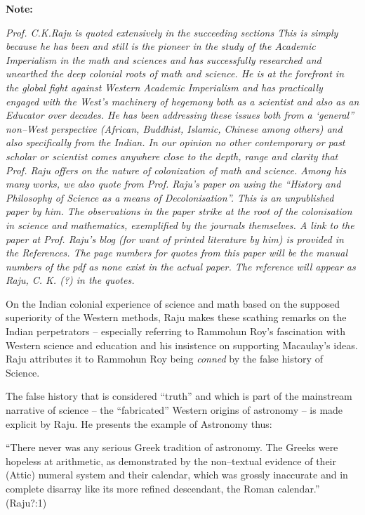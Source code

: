 \vskip 4pt

\textbf{Note:}

\vskip 4pt

\textit{Prof. C.K.Raju is quoted extensively in the succeeding sections This is simply because he has been and still is the pioneer in the study of the Academic Imperialism in the math and sciences and has successfully researched and unearthed the deep colonial roots of math and science. He is at the forefront in the global fight against Western Academic Imperialism and has practically engaged with the West’s machinery of hegemony both as a scientist and also as an Educator over decades. He has been addressing these issues both from a ‘general” non–West perspective (African, Buddhist, Islamic, Chinese among others) and also specifically from the Indian. In our opinion no other contemporary or past scholar or scientist comes anywhere close to the depth, range and clarity that Prof. Raju offers on the nature of colonization of math and science. Among his many works, we also quote from Prof. Raju’s paper on using the “History and Philosophy of Science as a means of Decolonisation”. This is an unpublished paper by him. The observations in the paper strike at the root of the colonisation in science and mathematics, exemplified by the journals themselves. A link to the paper at Prof. Raju’s blog (for want of printed literature by him) is provided in the References. The page numbers for quotes from this paper will be the manual numbers of the pdf as none exist in the actual paper. The reference will appear as Raju, C. K. (?) in the quotes.}

\vskip 3pt

On the Indian colonial experience of science and math based on the supposed superiority of the Western methods, Raju makes these scathing remarks on the Indian perpetrators – especially referring to Rammohun Roy’s fascination with Western science and education and his insistence on supporting Macaulay’s ideas. Raju attributes it to Rammohun Roy being \textit{conned} by the false history of Science.

The false history that is considered “truth” and which is part of the mainstream narrative of science – the “fabricated” Western origins of astronomy – is made explicit by Raju. He presents the example of Astronomy thus:

\begin{myquote}
“There never was any serious Greek tradition of astronomy. The Greeks were hopeless at arithmetic, as demonstrated by the non–textual evidence of their (Attic) numeral system and their calendar, which was grossly inaccurate and in complete disarray like its more refined descendant, the Roman calendar.” \hfill (Raju?:1)
\end{myquote}

